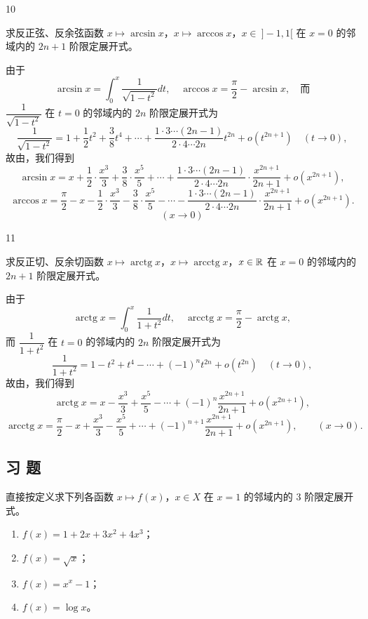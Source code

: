\begin{sourceexample}{10}

求反正弦、反余弦函数 $x\longmapsto\arcsin x$，$x\longmapsto\arccos x$，$x\in\ ]-1,1[$ 在 $x=0$ 的邻域内的 $2n+1$ 阶限定展开式。

由于
\[\arcsin x=\int_{0}^{x}\frac{1}{\sqrt{1-t^2}}dt,\quad \arccos x=\frac{\pi}{2}-\arcsin x,\quad\text{而}\]
$\dfrac{1}{\sqrt{1-t^2}}$ 在 $t=0$ 的邻域内的 $2n$ 阶限定展开式为
\[\frac{1}{\sqrt{1-t^2}}=1+\frac{1}{2}t^2+\frac{3}{8}t^4+\cdots+\frac{1\cdot3\cdots(2n-1)}{2\cdot4\cdots2n}t^{2n}+o(t^{2n+1})\quad(t\to0),\]
故由，我们得到
\[\arcsin x=x+\frac{1}{2}\cdot\frac{x^3}{3}+\frac{3}{8}\cdot\frac{x^5}{5}+\cdots+\frac{1\cdot3\cdots(2n-1)}{2\cdot4\cdots2n}\cdot\frac{x^{2n+1}}{2n+1}+o(x^{2n+1}),\]
\[\arccos x=\frac{\pi}{2}-x-\frac{1}{2}\cdot\frac{x^3}{3}-\frac{3}{8}\cdot\frac{x^5}{5}-\cdots-\frac{1\cdot3\cdots(2n-1)}{2\cdot4\cdots2n}\cdot\frac{x^{2n+1}}{2n+1}+o(x^{2n+1}).\]
\[(x\to0)\]

\end{sourceexample}

\begin{sourceexample}{11}

求反正切、反余切函数 $x\longmapsto\operatorname{arctg}x$，$x\longmapsto\operatorname{arcctg}x$，$x\in\mathbb{R}$ 在 $x=0$ 的邻域内的 $2n+1$ 阶限定展开式。

由于
\[\operatorname{arctg}x=\int_0^x\frac{1}{1+t^2}dt,\quad \operatorname{arcctg}x=\frac{\pi}{2}-\operatorname{arctg}x,\]
而 $\dfrac{1}{1+t^2}$ 在 $t=0$ 的邻域内的 $2n$ 阶限定展开式为
\[\frac{1}{1+t^2}=1-t^2+t^4-\cdots+(-1)^nt^{2n}+o(t^{2n})\quad(t\to0),\]
故由，我们得到
\[\operatorname{arctg}x=x-\frac{x^3}{3}+\frac{x^5}{5}-\cdots+(-1)^n\frac{x^{2n+1}}{2n+1}+o(x^{2n+1}),\]
\[\operatorname{arcctg}x=\frac{\pi}{2}-x+\frac{x^3}{3}-\frac{x^5}{5}+\cdots+(-1)^{n+1}\frac{x^{2n+1}}{2n+1}+o(x^{2n+1}),\qquad(x\to0).\]

\end{sourceexample}

\subsection*{习 题}

\begin{exercise}
	\item 直接按定义求下列各函数 $x\longmapsto f(x)$，$x\in X$ 在 $x=1$ 的邻域内的 $3$ 阶限定展开式。
	\begin{enumerate}[label=\arabic*)]
		\item $f(x)=1+2x+3x^2+4x^3$；
		\item $f(x)=\sqrt{x}$；
		\item $f(x)=x^x-1$；
		\item $f(x)=\log x$。
	\end{enumerate}
\end{exercise}

